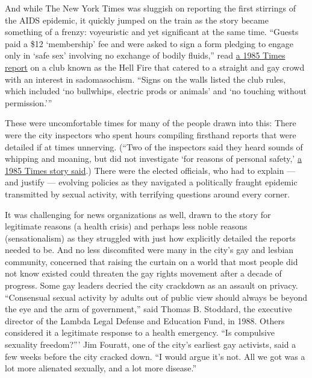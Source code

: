 And while The New York Times was sluggish on reporting the first
stirrings of the AIDS epidemic, it quickly jumped on the train as the
story became something of a frenzy: voyeuristic and yet significant at
the same time. ``Guests paid a \$12 `membership' fee and were asked to
sign a form pledging to engage only in `safe sex' involving no exchange
of bodily fluids,'' read
\href{https://www.nytimes.com/1985/11/09/nyregion/at-homosexual-establishments-a-new-climate-of-caution.html}{a
1985 Times report} on a club known as the Hell Fire that catered to a
straight and gay crowd with an interest in sadomasochism. ``Signs on the
walls listed the club rules, which included `no bullwhips, electric
prods or animals' and `no touching without permission.'''

These were uncomfortable times for many of the people drawn into this:
There were the city inspectors who spent hours compiling firsthand
reports that were detailed if at times unnerving. (``Two of the
inspectors said they heard sounds of whipping and moaning, but did not
investigate `for reasons of personal safety,'
\href{https://www.nytimes.com/1985/11/08/nyregion/city-closes-bar-frequented-by-homosexuals-citing-sexual-activity-linked-to-aids.html}{a
1985 Times story said}.) There were the elected officials, who had to
explain --- and justify --- evolving policies as they navigated a
politically fraught epidemic transmitted by sexual activity, with
terrifying questions around every corner.

It was challenging for news organizations as well, drawn to the story
for legitimate reasons (a health crisis) and perhaps less noble reasons
(sensationalism) as they struggled with just how explicitly detailed the
reports needed to be. And no less discomfited were many in the city's
gay and lesbian community, concerned that raising the curtain on a world
that most people did not know existed could threaten the gay rights
movement after a decade of progress. Some gay leaders decried the city
crackdown as an assault on privacy. ``Consensual sexual activity by
adults out of public view should always be beyond the eye and the arm of
government,'' said Thomas B. Stoddard, the executive director of the
Lambda Legal Defense and Education Fund, in 1988. Others considered it a
legitimate response to a health emergency. ``Is compulsive sexuality
freedom?''' Jim Fouratt, one of the city's earliest gay activists, said
a few weeks before the city cracked down. ``I would argue it's not. All
we got was a lot more alienated sexually, and a lot more disease.''

